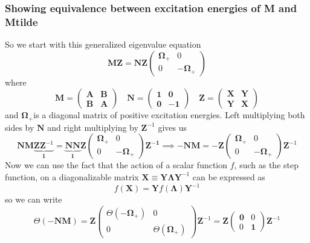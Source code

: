 \subsubsection{Showing equivalence between excitation energies of M and Mtilde}
So we start with this generalized eigenvalue equation
$$
\mathbf{M}\bm{Z}=\mathbf{N}\bm{Z}\left(\begin{array}{cc}
\boldsymbol{\Omega}_{+} & 0 \\
0 & -\boldsymbol{\Omega}_{+}
\end{array}\right)
$$
where
$$
\mathbf{M} =\left(\begin{array}{ll}
\mathbf{A} & \mathbf{B} \\
\mathbf{B} & \mathbf{A}
\end{array}\right) \quad 
\mathbf{N} =\left(\begin{array}{cc}
\mathbf{1} & \mathbf{0} \\
\mathbf{0} & -\mathbf{1}
\end{array}\right) \quad
\bm{Z} =\left(\begin{array}{ll}
\bm{X} & \bm{Y} \\
\bm{Y} & \bm{X}
\end{array}\right)
$$
and $\boldsymbol{\Omega}_{+}$is a diagonal matrix of positive excitation energies. Left multiplying both sides by $\bm{N}$ and right multiplying by $\bm{Z}^{-1}$ gives us
\begin{equation}
    \bm{N}\bm{M}\underbrace{\bm{Z} \bm{Z}^{-1}}_{\bm{1}} = \underbrace{\bm{N}\bm{N}}_{\bm{1}}\bm{Z}\left(\begin{array}{cc}
\boldsymbol{\Omega}_{+} & 0 \\
0 & -\boldsymbol{\Omega}_{+}
\end{array}\right) \bm{Z^{-1}} \implies - \bm{N}\bm{M} = -\bm{Z}\left(\begin{array}{cc}\boldsymbol{\Omega}_{+} & 0 \\
0 & -\boldsymbol{\Omega}_{+}
\end{array}\right)\bm{Z}^{-1}
\end{equation}
Now we can use the fact that the action of a scalar function $f$, such as the step function, on a diagonalizable matrix $\bm{X} \equiv \bm{Y} \bm{\Lambda} \bm{Y}^{-1}$ can be expressed as
$$
f(\bm{X}) = \bm{Y} f(\bm{\Lambda}) \bm{Y}^{-1}
$$
so we can write
\begin{equation}
    \Theta(-\bm{N}\bm{M}) = \bm{Z} \left(\begin{array}{cc}\Theta(-\boldsymbol{\Omega}_{+}) & 0 \\ 0 & \Theta(\boldsymbol{\Omega}_{+})\end{array}\right)\bm{Z}^{-1} = \bm{Z} \left(\begin{array}{cc}\bm{0} & 0 \\ 0 & \bm{1}\end{array}\right)\bm{Z}^{-1}
\end{equation}
